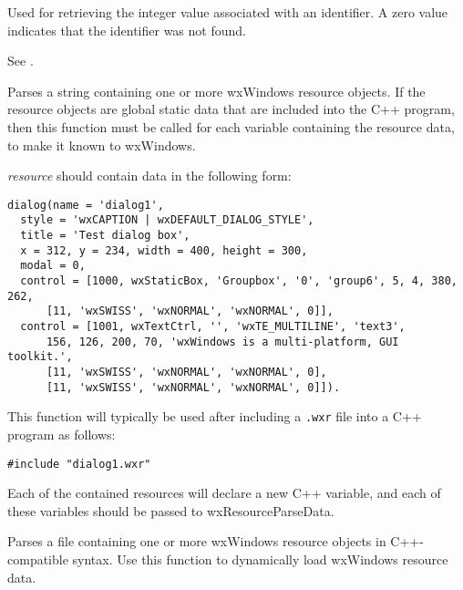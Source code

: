 Used for retrieving the integer value associated with an identifier.
A zero value indicates that the identifier was not found.

See .

\label{wxresourcedata}


Parses a string containing one or more wxWindows resource objects. If
the resource objects are global static data that are included into the
C++ program, then this function must be called for each variable
containing the resource data, to make it known to wxWindows.

{\it resource} should contain data in the following form:

\begin{verbatim}
dialog(name = 'dialog1',
  style = 'wxCAPTION | wxDEFAULT_DIALOG_STYLE',
  title = 'Test dialog box',
  x = 312, y = 234, width = 400, height = 300,
  modal = 0,
  control = [1000, wxStaticBox, 'Groupbox', '0', 'group6', 5, 4, 380, 262,
      [11, 'wxSWISS', 'wxNORMAL', 'wxNORMAL', 0]],
  control = [1001, wxTextCtrl, '', 'wxTE_MULTILINE', 'text3',
      156, 126, 200, 70, 'wxWindows is a multi-platform, GUI toolkit.',
      [11, 'wxSWISS', 'wxNORMAL', 'wxNORMAL', 0],
      [11, 'wxSWISS', 'wxNORMAL', 'wxNORMAL', 0]]).
\end{verbatim}

This function will typically be used after including a {\tt .wxr} file into
a C++ program as follows:

\begin{verbatim}
#include "dialog1.wxr"
\end{verbatim}

Each of the contained resources will declare a new C++ variable, and each
of these variables should be passed to wxResourceParseData.



Parses a file containing one or more wxWindows resource objects
in C++-compatible syntax. Use this function to dynamically load
wxWindows resource data.

\label{wxresourceparsestring}

